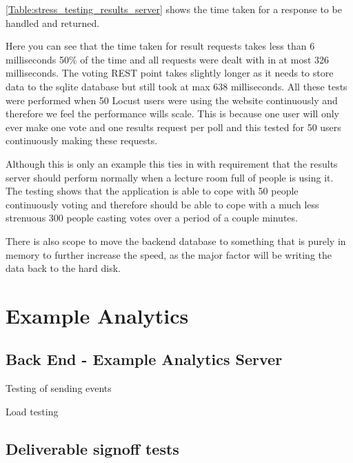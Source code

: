 \autoref{Table:stress_testing_results_server} shows the time taken for a response to be handled and returned.

Here you can see that the time taken for result requests takes less than 6 milliseconds 50\% of the time and all requests were dealt with in at most 326 milliseconds. The voting REST point takes slightly longer as it needs to store data to the sqlite database but still took at max 638 milliseconds. All these tests were performed when 50 Locust users were using the website continuously and therefore we feel the performance wills scale. This is because one user will only ever make one vote and one results request per poll and this tested for 50 users continuously making these requests.

Although this is only an example this ties in with requirement  that the results server should perform normally when a lecture room full of people is using it. The testing shows that the application is able to cope with 50 people continuously voting and therefore should be able to cope with a much less strenuous 300 people casting votes over a period of a couple minutes.

There is also scope to move the backend database to something that is purely in memory to further increase the speed, as the major factor will be writing the data back to the hard disk.

\section{Example Analytics}

\subsection{Back End - Example Analytics Server}
\label{Subsection:Analytics server in example}
Testing of sending events

Load testing

\subsection{Deliverable signoff tests}




